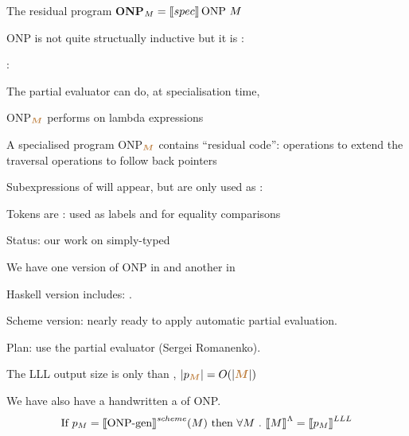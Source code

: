 \documentclass[12pt,fleqn,landscape]{article}
\begin{document}
\begin{slide}{The residual program \textbf{ONP}$_M = \lsem \lowercase{spec}\rsem \, \mbox{ONP}\ M$}

ONP is not quite structually inductive but it is :\\

\hfill{}

:
\bi
\vair

\ii The partial evaluator can do, at specialisation time,

  \hfill {}
\ii ONP$_{{\color{brown}\textit{\boldmath{$M$}}}}$ performs  on  lambda expressions
\vair

\ii A specialised program ONP$_{{\color{brown}\textit{\boldmath{$M$}}}}$ contains ``residual code'':
  \bi
  \ii operations to extend the traversal
  \ii operations to follow back pointers
  \ei
\vair

\ii Subexpressions of  will appear, but are only used as :

  Tokens are : used as labels and for equality comparisons
\ei

\end{slide}



\begin{slide}{Status: our work on simply-typed \lc }

\be
\item We have one version of ONP  in   and another in 
\item {\sc Haskell} version includes: .
\item {\sc Scheme} version: nearly ready to apply automatic partial evaluation.

  Plan: use the  partial evaluator (Sergei Romanenko).

\item The LLL output size is only 
  than , $|p_{{\color{brown}\textit{\boldmath{$M$}}}}| = O(|{\color{brown}\textit{\boldmath{$M$}}}|)$
\item We have also have a handwritten a  of ONP.
  $$
  \mbox{If\ }p_M = \mbox{$\lbrack\hspace{-0.3ex}\lbrack$} \mbox{ONP-gen} \mbox{$\rbrack\hspace{-0.3ex}\rbrack$}^{\sc scheme} (M)
  \mbox{\ then\ }
  \forall M \ .\ \mbox{$\lbrack\hspace{-0.3ex}\lbrack$} M\mbox{$\rbrack\hspace{-0.3ex}\rbrack$}^\Lambda =  \mbox{$\lbrack\hspace{-0.3ex}\lbrack$} p_M \mbox{$\rbrack\hspace{-0.3ex}\rbrack$}^{LLL} 
  $$

  {\Large {}}
\ee
\end{slide}
\end{document}
